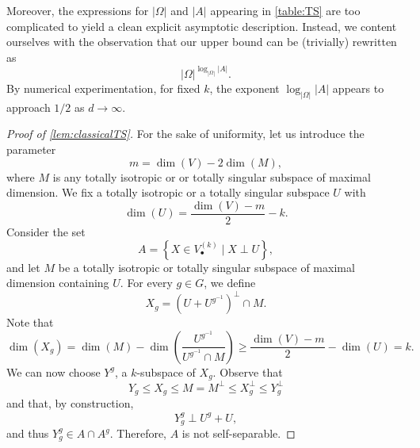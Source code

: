 \documentclass[a4paper]{amsart}
\theoremstyle{definition}
\begin{document}
Moreover, the expressions for \( |\Omega| \) and \( |A| \) appearing in \cref{table:TS} are too complicated to yield a clean explicit asymptotic description. Instead, we content ourselves with the observation that our upper bound can be (trivially) rewritten as
\[
|\Omega|^{\log_{|\Omega|} |A|}.
\]
By numerical experimentation, for fixed \(k\), the exponent \(\log_{|\Omega|} |A|\) appears to approach \(1/2\) as \(d \to \infty\).


\begin{proof}[Proof of \cref{lem:classicalTS}]
    For the sake of uniformity, let us introduce the parameter
    \[m = \dim(V) - 2 \dim(M) ,\]
    where $M$ is any totally isotropic or or totally singular subspace of maximal dimension.  We fix a totally isotropic or a totally singular subspace $U$ with
    \[ \dim(U) = \frac{\dim(V)-m}{2} - k.\]
    Consider the set
    \[ A = \left\{ X \in V^{(k)}_{\bullet} \mid X \perp U \right\} ,\]
    and let $M$ be a totally isotropic or totally singular subspace of maximal dimension containing $U$.
    For every $g \in G$,  we define
    \[ X_g = (U+U^{g^{-1}})^\perp \cap M. \]
    Note that
    \[\dim(X_g) = \dim(M) - \dim\left(  \frac{U^{g^{-1}}}{U^{g^{-1}} \cap M} \right) \ge \frac{\dim(V)-m}{2} - \dim(U) =  k  .\]
    We can now choose $Y^g$, a $k$-subspace of $X_g$. Observe that
    \[ Y_g \le X_g \le  M = M^\perp \le X_g^\perp \le Y_g^\perp \]
    and that, by construction,
    \[ Y_g^g \perp U^g + U ,\]
    and thus $Y_g^g \in A \cap A^g$. Therefore, $A$ is not self-separable.
    

\end{proof}
\end{document}
